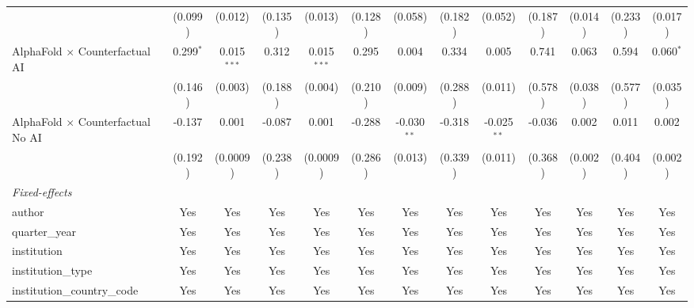 \begin{tabular}{lcccccccccccc}
                                            & (0.099)      & (0.012)        & (0.135)      & (0.013)        & (0.128) & (0.058)       & (0.182) & (0.052)       & (0.187)      & (0.014)       & (0.233) & (0.017)\\   
   AlphaFold $\times$ Counterfactual AI     & 0.299$^{*}$  & 0.015$^{***}$  & 0.312        & 0.015$^{***}$  & 0.295   & 0.004         & 0.334   & 0.005         & 0.741        & 0.063         & 0.594   & 0.060$^{*}$\\   
                                            & (0.146)      & (0.003)        & (0.188)      & (0.004)        & (0.210) & (0.009)       & (0.288) & (0.011)       & (0.578)      & (0.038)       & (0.577) & (0.035)\\   
   AlphaFold $\times$ Counterfactual No AI  & -0.137       & 0.001          & -0.087       & 0.001          & -0.288  & -0.030$^{**}$ & -0.318  & -0.025$^{**}$ & -0.036       & 0.002         & 0.011   & 0.002\\   
                                            & (0.192)      & (0.0009)       & (0.238)      & (0.0009)       & (0.286) & (0.013)       & (0.339) & (0.011)       & (0.368)      & (0.002)       & (0.404) & (0.002)\\   
   \midrule
   \emph{Fixed-effects}\\
   author                                   & Yes          & Yes            & Yes          & Yes            & Yes     & Yes           & Yes     & Yes           & Yes          & Yes           & Yes     & Yes\\  
   quarter\_year                            & Yes          & Yes            & Yes          & Yes            & Yes     & Yes           & Yes     & Yes           & Yes          & Yes           & Yes     & Yes\\  
   institution                              & Yes          & Yes            & Yes          & Yes            & Yes     & Yes           & Yes     & Yes           & Yes          & Yes           & Yes     & Yes\\  
   institution\_type                        & Yes          & Yes            & Yes          & Yes            & Yes     & Yes           & Yes     & Yes           & Yes          & Yes           & Yes     & Yes\\  
   institution\_country\_code               & Yes          & Yes            & Yes          & Yes            & Yes     & Yes           & Yes     & Yes           & Yes          & Yes           & Yes     & Yes\\  

\end{tabular}

